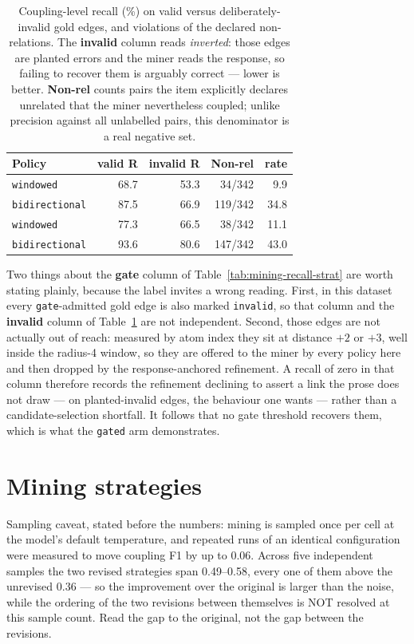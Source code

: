 \documentclass[11pt]{article}
\begin{document}
\begin{table}[htbp]
\centering
\small
\caption{Coupling-level recall (\%) on valid versus deliberately-invalid gold edges, and violations of the declared non-relations. The \textbf{invalid} column reads \emph{inverted}: those edges are planted errors and the miner reads the response, so failing to recover them is arguably correct --- lower is better. \textbf{Non-rel} counts pairs the item explicitly declares unrelated that the miner nevertheless coupled; unlike precision against all unlabelled pairs, this denominator is a real negative set.}
\label{tab:mining-validity}
\begin{tabular}{lrrrr}
\toprule
Policy & valid R & invalid R & Non-rel & rate \\
\midrule
\texttt{windowed} & 68.7 & 53.3 & 34/342 & 9.9 \\
\texttt{bidirectional} & 87.5 & 66.9 & 119/342 & 34.8 \\
\texttt{windowed} & 77.3 & 66.5 & 38/342 & 11.1 \\
\texttt{bidirectional} & 93.6 & 80.6 & 147/342 & 43.0 \\
\bottomrule
\end{tabular}
\end{table}

Two things about the \textbf{gate} column of Table~\ref{tab:mining-recall-strat} are worth stating plainly, because the label invites a wrong reading. First, in this dataset every \texttt{gate}-admitted gold edge is also marked \texttt{invalid}, so that column and the \textbf{invalid} column of Table~\ref{tab:mining-validity} are not independent. Second, those edges are not actually out of reach: measured by atom index they sit at distance $+2$ or $+3$, well inside the radius-4 window, so they are offered to the miner by every policy here and then dropped by the response-anchored refinement. A recall of zero in that column therefore records the refinement declining to assert a link the prose does not draw --- on planted-invalid edges, the behaviour one wants --- rather than a candidate-selection shortfall. It follows that no gate threshold recovers them, which is what the \texttt{gated} arm demonstrates.

\section{Mining strategies}\label{sec:strategies}

Sampling caveat, stated before the numbers: mining is sampled once per cell at the model's default temperature, and repeated runs of an identical configuration were measured to move coupling F1 by up to 0.06. Across five independent samples the two revised strategies span 0.49--0.58, every one of them above the unrevised 0.36 --- so the improvement over the original is larger than the noise, while the ordering of the two revisions between themselves is NOT resolved at this sample count. Read the gap to the original, not the gap between the revisions.
\end{document}
